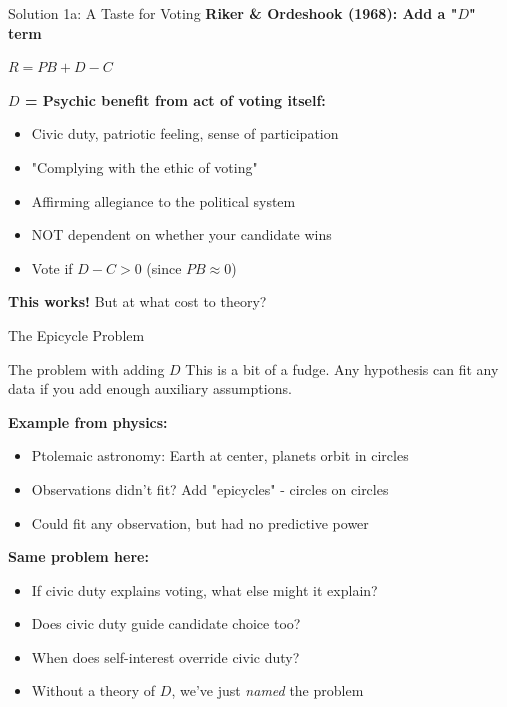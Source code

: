 \documentclass[10pt]{beamer}
\begin{document}
\begin{frame}{Solution 1a: A Taste for Voting}
\textbf{Riker \& Ordeshook (1968): Add a "$D$" term}


\begin{center}
\Large
\alert{$R = PB + D - C$}
\end{center}


\textbf{$D$ = Psychic benefit from act of voting itself:}
\begin{itemize}
\item Civic duty, patriotic feeling, sense of participation
\item "Complying with the ethic of voting"
\item Affirming allegiance to the political system
\item NOT dependent on whether your candidate wins
\item Vote if $D - C > 0$ (since $PB \approx 0$)
\end{itemize}


\textbf{This works!} But at what cost to theory?
\end{frame}

\begin{frame}{The Epicycle Problem}
\begin{alertblock}{The problem with adding $D$}
This is a bit of a fudge. Any hypothesis can fit any data if you add enough auxiliary assumptions.
\end{alertblock}


\textbf{Example from physics:}
\begin{itemize}
\item Ptolemaic astronomy: Earth at center, planets orbit in circles
\item Observations didn't fit? Add "epicycles" - circles on circles
\item Could fit any observation, but had no predictive power
\end{itemize}


\textbf{Same problem here:}
\begin{itemize}
\item If civic duty explains voting, what else might it explain?
\item Does civic duty guide candidate choice too?
\item When does self-interest override civic duty?
\item Without a theory of $D$, we've just \emph{named} the problem
\end{itemize}
\end{frame}
\end{document}

